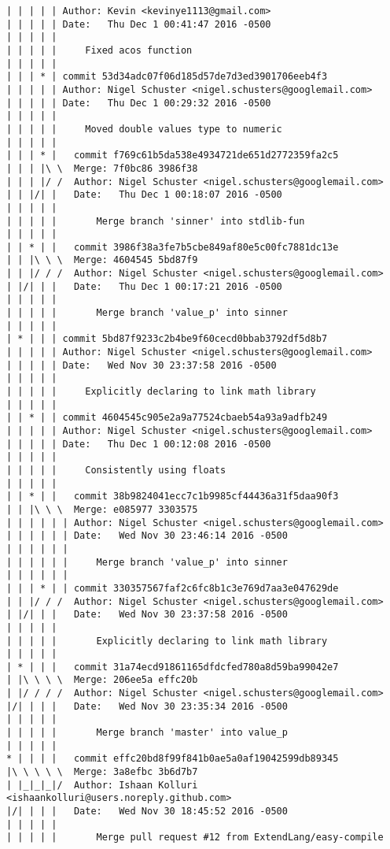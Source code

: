 \begin{lstlisting}
| | | | | Author: Kevin <kevinye1113@gmail.com>
| | | | | Date:   Thu Dec 1 00:41:47 2016 -0500
| | | | | 
| | | | |     Fixed acos function
| | | | |      
| | | * | commit 53d34adc07f06d185d57de7d3ed3901706eeb4f3
| | | | | Author: Nigel Schuster <nigel.schusters@googlemail.com>
| | | | | Date:   Thu Dec 1 00:29:32 2016 -0500
| | | | | 
| | | | |     Moved double values type to numeric
| | | | |        
| | | * |   commit f769c61b5da538e4934721de651d2772359fa2c5
| | | |\ \  Merge: 7f0bc86 3986f38
| | | |/ /  Author: Nigel Schuster <nigel.schusters@googlemail.com>
| | |/| |   Date:   Thu Dec 1 00:18:07 2016 -0500
| | | | |   
| | | | |       Merge branch 'sinner' into stdlib-fun
| | | | |        
| | * | |   commit 3986f38a3fe7b5cbe849af80e5c00fc7881dc13e
| | |\ \ \  Merge: 4604545 5bd87f9
| | |/ / /  Author: Nigel Schuster <nigel.schusters@googlemail.com>
| |/| | |   Date:   Thu Dec 1 00:17:21 2016 -0500
| | | | |   
| | | | |       Merge branch 'value_p' into sinner
| | | | |      
| * | | | commit 5bd87f9233c2b4be9f60cecd0bbab3792df5d8b7
| | | | | Author: Nigel Schuster <nigel.schusters@googlemail.com>
| | | | | Date:   Wed Nov 30 23:37:58 2016 -0500
| | | | | 
| | | | |     Explicitly declaring to link math library
| | | | |      
| | * | | commit 4604545c905e2a9a77524cbaeb54a93a9adfb249
| | | | | Author: Nigel Schuster <nigel.schusters@googlemail.com>
| | | | | Date:   Thu Dec 1 00:12:08 2016 -0500
| | | | | 
| | | | |     Consistently using floats
| | | | |        
| | * | |   commit 38b9824041ecc7c1b9985cf44436a31f5daa90f3
| | |\ \ \  Merge: e085977 3303575
| | | | | | Author: Nigel Schuster <nigel.schusters@googlemail.com>
| | | | | | Date:   Wed Nov 30 23:46:14 2016 -0500
| | | | | | 
| | | | | |     Merge branch 'value_p' into sinner
| | | | | |       
| | | * | | commit 330357567faf2c6fc8b1c3e769d7aa3e047629de
| | |/ / /  Author: Nigel Schuster <nigel.schusters@googlemail.com>
| |/| | |   Date:   Wed Nov 30 23:37:58 2016 -0500
| | | | |   
| | | | |       Explicitly declaring to link math library
| | | | |        
| * | | |   commit 31a74ecd91861165dfdcfed780a8d59ba99042e7
| |\ \ \ \  Merge: 206ee5a effc20b
| |/ / / /  Author: Nigel Schuster <nigel.schusters@googlemail.com>
|/| | | |   Date:   Wed Nov 30 23:35:34 2016 -0500
| | | | |   
| | | | |       Merge branch 'master' into value_p
| | | | |        
* | | | |   commit effc20bd8f99f841b0ae5a0af19042599db89345
|\ \ \ \ \  Merge: 3a8efbc 3b6d7b7
| |_|_|_|/  Author: Ishaan Kolluri <ishaankolluri@users.noreply.github.com>
|/| | | |   Date:   Wed Nov 30 18:45:52 2016 -0500
| | | | |   
| | | | |       Merge pull request #12 from ExtendLang/easy-compile

\end{lstlisting}
